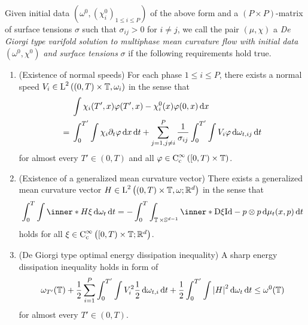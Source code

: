 \begin{definition}
	Given initial data 
	$ (
	 \omega^{ 0 },
	( \chi_{ i}^{ 0 } )_{ 1 \leq i \leq P}
	) $
	of the above form and a $ (P \times P) $-matrix of surface tensions $ 
	\sigma 
	$ such that $ \sigma_{ i j } > 0 $ for $ i \neq j 
	$, we call the pair $ \left( \mu , \chi \right) $ a
	\emph{De Giorgi type varifold solution to multiphase mean curvature flow 
		with initial data} $ ( \omega^{ 0 } , \chi^{ 0 } ) $ \emph{and surface 
		tensions} $ \sigma $ if the following requirements hold true.
	\begin{enumerate}
		\item (Existence of normal speeds)
		For each phase $ 1 \leq i \leq P $, there exists a normal speed
		$ V_{ i } \in \operatorname{L}^{ 2 } \left(
		( 0 , T ) \times \operatorname{\mathbb{T}}, \omega_{ i } \right) $ in the sense 
		that
		\begin{align}
			\notag
			&
			\int
			\chi_{ i } ( T', x ) \varphi ( T', x ) 
			-
			\chi_{ i }^{ 0 } ( x ) \varphi ( 0 , x )
			\dd{ x }
			\\
			\label{equation_varifold_velocity_multiphase}
			={} &
			\int_{ 0 }^{ T' }
			\int
			\chi_{ i }
			\partial_{ t } \varphi
			\dd{ x }
			\dd{ t }
			+
			\sum_{ j =1, j \neq i  }^{ P }
			\frac{ 1 }{ \sigma_{ i j } }
			\int_{ 0 }^{ T' }
			\int
			V_{ i }
			\varphi
			\dd{ \omega_{ t , i j } }
			\dd{ t }
		\end{align}
		for almost every $ T' \in ( 0 , T ) $ and all $ \varphi \in \operatorname{C}_{ 
			\mathrm{c} }^{ \infty } \left( [ 0 , T ) \times \operatorname{\mathbb{T}}\right) 
		$.
		
		\item (Existence of a generalized mean curvature vector)
		There exists a generalized mean curvature vector 
		$ H \in \operatorname{L}^{ 2 } \left(
		( 0 , T )\times \operatorname{\mathbb{T}} , \omega; \mathbb{ R }^{ d } \right)
		$
		in the sense that
		\begin{equation}
			\label{equation_varifold_mean_curvature_multiphase}
			\int_{ 0 }^{ T }
			\int
			\inner*{ H }{ \xi }
			\dd{ \omega_{ t } }
			\dd{ t }
			=
			-
			\int_{ 0 }^{ T }
			\int_{ \flattorus \times \mathbb{ S }^{ d - 1 } }
			\inner*{ \diff \xi }
			{ \mathrm{Id} - p \otimes p }
			\dd{ \mu_{ t } ( x , p ) }
			\dd{ t }
		\end{equation}
		holds for all $ \xi \in \operatorname{C}_{ 
			\mathrm{c} }^{ \infty } \left( [ 0 , T ) \times \operatorname{\mathbb{T}} ; 
			\mathbb{ 
			R }^{ d } \right) $.
		
		\item (De Giorgi type optimal energy dissipation inequality)
		A sharp energy dissipation inequality holds in form of
		\begin{equation}
			\label{equation_varifold_energy_dissipation_inequality}
			\omega_{ T' } ( \operatorname{\mathbb{T}} )
			+
			\frac{ 1 }{ 2 }
			\sum_{ i = 1 }^{ P }
			\int_{ 0 }^{ T' }
			\int
			V_{ i }^{ 2 }
			\frac{ 1 }{ 2 }
			\dd{ \omega_{ t , i } }
			\dd{ t }
			+
			\frac{ 1 }{ 2 }
			\int_{ 0 }^{ T' }
			\int
			\abs{ H }^{ 2 }
			\dd{ \omega_{ t } }
			\dd{ t }
			\leq
			\omega^{ 0 } ( \operatorname{\mathbb{T}} )
		\end{equation}
		for almost every $ T' \in ( 0 , T ) $.
		

\end{enumerate}
\end{definition}
